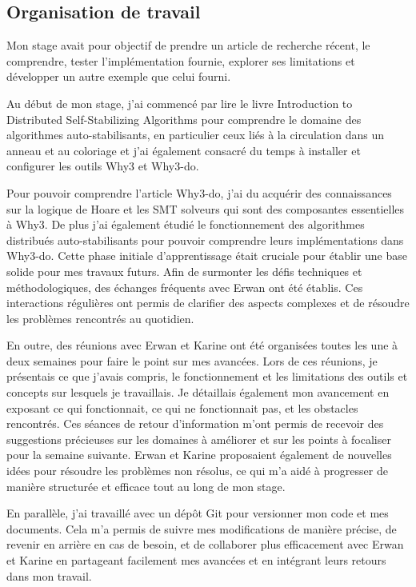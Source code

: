 \documentclass[11pt]{article}
\begin{document}
\subsection{Organisation de travail}
\label{sec:org2f7447c}

Mon stage avait pour objectif de prendre un article de recherche récent, le comprendre, tester l’implémentation fournie, 
explorer ses limitations et développer un autre exemple que celui fourni. 

Au début de mon stage, j'ai commencé par lire le livre Introduction to Distributed Self-Stabilizing Algorithms  pour comprendre le domaine des algorithmes auto-stabilisants, 
en particulier ceux liés à la circulation dans un anneau et au coloriage et j'ai également consacré du temps à installer et configurer les outils Why3 et Why3-do.  

Pour pouvoir comprendre l'article Why3-do, j'ai du acquérir des connaissances sur la logique de Hoare et les SMT solveurs qui sont des composantes essentielles à Why3.
De plus j'ai également étudié le fonctionnement des algorithmes distribués auto-stabilisants pour pouvoir comprendre leurs implémentations dans Why3-do.
Cette phase initiale d'apprentissage était cruciale pour établir une base solide pour mes travaux futurs. 
Afin de surmonter les défis techniques et méthodologiques, des échanges fréquents avec Erwan ont été établis. 
Ces interactions régulières ont permis de clarifier des aspects complexes et de résoudre les problèmes rencontrés au quotidien.

En outre, des réunions avec Erwan et Karine ont été organisées toutes les une à deux semaines pour faire le point sur mes avancées. 
Lors de ces réunions, je présentais ce que j'avais compris, le fonctionnement et les limitations des outils et concepts sur lesquels je travaillais. 
Je détaillais également mon avancement en exposant ce qui fonctionnait, ce qui ne fonctionnait pas, et les obstacles rencontrés. 
Ces séances de retour d'information m'ont permis de recevoir des suggestions précieuses sur les domaines à améliorer 
et sur les points à focaliser pour la semaine suivante. Erwan et Karine proposaient également de nouvelles idées pour résoudre les problèmes non résolus,
 ce qui m'a aidé à progresser de manière structurée et efficace tout au long de mon stage.

En parallèle, j'ai travaillé avec un dépôt Git pour versionner mon code et mes documents. 
Cela m'a permis de suivre mes modifications de manière précise, de revenir en arrière en cas de besoin, 
et de collaborer plus efficacement avec Erwan et Karine en partageant facilement mes avancées et en intégrant leurs retours dans mon travail.
\end{document}
